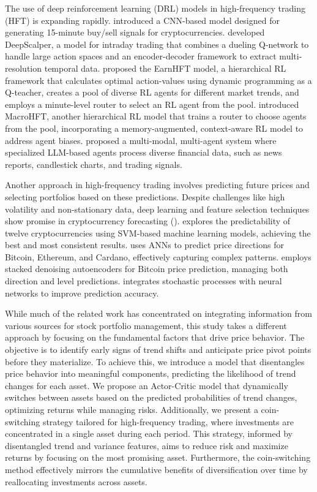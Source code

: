 The use of deep reinforcement learning (DRL) models in high-frequency trading (HFT) is expanding rapidly. \citet{asare2024deep} introduced a CNN-based model designed for generating 15-minute buy/sell signals for cryptocurrencies. \citet{sun2022deepscalper} developed DeepScalper, a model for intraday trading that combines a dueling Q-network to handle large action spaces and an encoder-decoder framework to extract multi-resolution temporal data. \citet{qin2024earnhft} proposed the EarnHFT model, a hierarchical RL framework that calculates optimal action-values using dynamic programming as a Q-teacher, creates a pool of diverse RL agents for different market trends, and employs a minute-level router to select an RL agent from the pool. \citet{zong2024macrohft} introduced MacroHFT, another hierarchical RL model that trains a router to choose agents from the pool, incorporating a memory-augmented, context-aware RL model to address agent biases. \citet{fatemi2024finvision} proposed a multi-modal, multi-agent system where specialized LLM-based agents process diverse financial data, such as news reports, candlestick charts, and trading signals.

Another approach in high-frequency trading involves predicting future prices and selecting portfolios based on these predictions. Despite challenges like high volatility and non-stationary data, deep learning and feature selection techniques show promise in cryptocurrency forecasting (\citet{otabek2024prediction}). \citet{akyildirim2021prediction} explores the predictability of twelve cryptocurrencies using SVM-based machine learning models, achieving the best and most consistent results. \citet{ye2021predicting} uses ANNs to predict price directions for Bitcoin, Ethereum, and Cardano, effectively capturing complex patterns. \citet{liu2021forecasting} employs stacked denoising autoencoders for Bitcoin price prediction, managing both direction and level predictions. \citet{jay2020stochastic} integrates stochastic processes with neural networks to improve prediction accuracy.

While much of the related work has concentrated on integrating information from various sources for stock portfolio management, this study takes a different approach by focusing on the fundamental factors that drive price behavior. The objective is to identify early signs of trend shifts and anticipate price pivot points before they materialize. To achieve this, we introduce a model that disentangles price behavior into meaningful components, predicting the likelihood of trend changes for each asset. We propose an Actor-Critic model that dynamically switches between assets based on the predicted probabilities of trend changes, optimizing returns while managing risks. Additionally, we present a coin-switching strategy tailored for high-frequency trading, where investments are concentrated in a single asset during each period. This strategy, informed by disentangled trend and variance features, aims to reduce risk and maximize returns by focusing on the most promising asset. Furthermore, the coin-switching method effectively mirrors the cumulative benefits of diversification over time by reallocating investments across assets.